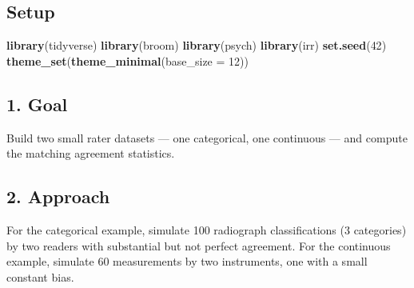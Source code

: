 \documentclass[
]{article}
\newenvironment{Shaded}{\begin{snugshade}}{\end{snugshade}}
\newcommand{\AttributeTok}[1]{\textcolor[rgb]{0.13,0.29,0.53}{#1}}
\newcommand{\DecValTok}[1]{\textcolor[rgb]{0.00,0.00,0.81}{#1}}
\newcommand{\FunctionTok}[1]{\textcolor[rgb]{0.13,0.29,0.53}{\textbf{#1}}}
\newcommand{\NormalTok}[1]{#1}
\begin{document}
\subsection{Setup}\label{setup}

\begin{Shaded}
\begin{Highlighting}[]
\FunctionTok{library}\NormalTok{(tidyverse)}
\FunctionTok{library}\NormalTok{(broom)}
\FunctionTok{library}\NormalTok{(psych)}
\FunctionTok{library}\NormalTok{(irr)}
\FunctionTok{set.seed}\NormalTok{(}\DecValTok{42}\NormalTok{)}
\FunctionTok{theme\_set}\NormalTok{(}\FunctionTok{theme\_minimal}\NormalTok{(}\AttributeTok{base\_size =} \DecValTok{12}\NormalTok{))}
\end{Highlighting}
\end{Shaded}

\subsection{1. Goal}\label{goal}

Build two small rater datasets --- one categorical, one continuous ---
and compute the matching agreement statistics.

\subsection{2. Approach}\label{approach}

For the categorical example, simulate 100 radiograph classifications (3
categories) by two readers with substantial but not perfect agreement.
For the continuous example, simulate 60 measurements by two instruments,
one with a small constant bias.
\end{document}
